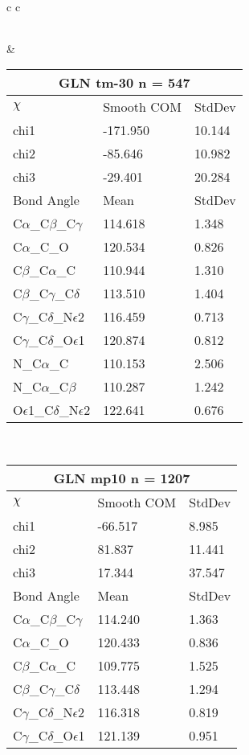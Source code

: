 \begin{longtable}{ c c }
\begin{tabular}{ l l l }
  \bottomrule
  \end{tabular}
  &
  \begin{tabular}{ l l l }
  \toprule
  \multicolumn{3}{c}{GLN \textbf{tm-30} n = 547} \\ \toprule
  $\chi$       & Smooth COM & StdDev \\ \midrule
  chi1 & -171.950 & 10.144 \\ 
  chi2 & -85.646 & 10.982 \\ 
  chi3 & -29.401 & 20.284 \\ \midrule
  Bond Angle   & Mean     & StdDev \\ \midrule
  C$\alpha$\_C$\beta$\_C$\gamma$ & 114.618 & 1.348\\
  C$\alpha$\_C\_O & 120.534 & 0.826\\
  C$\beta$\_C$\alpha$\_C & 110.944 & 1.310\\
  C$\beta$\_C$\gamma$\_C$\delta$ & 113.510 & 1.404\\
  C$\gamma$\_C$\delta$\_N$\epsilon$2 & 116.459 & 0.713\\
  C$\gamma$\_C$\delta$\_O$\epsilon$1 & 120.874 & 0.812\\
  N\_C$\alpha$\_C & 110.153 & 2.506\\
  N\_C$\alpha$\_C$\beta$ & 110.287 & 1.242\\
  O$\epsilon$1\_C$\delta$\_N$\epsilon$2 & 122.641 & 0.676\\
  \bottomrule
  \end{tabular}
  \\
  \begin{tabular}{ l l l }
  \toprule
  \multicolumn{3}{c}{GLN \textbf{mp10} n = 1207} \\ \toprule
  $\chi$       & Smooth COM & StdDev \\ \midrule
  chi1 & -66.517 & 8.985 \\ 
  chi2 & 81.837 & 11.441 \\ 
  chi3 & 17.344 & 37.547 \\ \midrule
  Bond Angle   & Mean     & StdDev \\ \midrule
  C$\alpha$\_C$\beta$\_C$\gamma$ & 114.240 & 1.363\\
  C$\alpha$\_C\_O & 120.433 & 0.836\\
  C$\beta$\_C$\alpha$\_C & 109.775 & 1.525\\
  C$\beta$\_C$\gamma$\_C$\delta$ & 113.448 & 1.294\\
  C$\gamma$\_C$\delta$\_N$\epsilon$2 & 116.318 & 0.819\\
  C$\gamma$\_C$\delta$\_O$\epsilon$1 & 121.139 & 0.951\\

\end{tabular}
\end{longtable}

